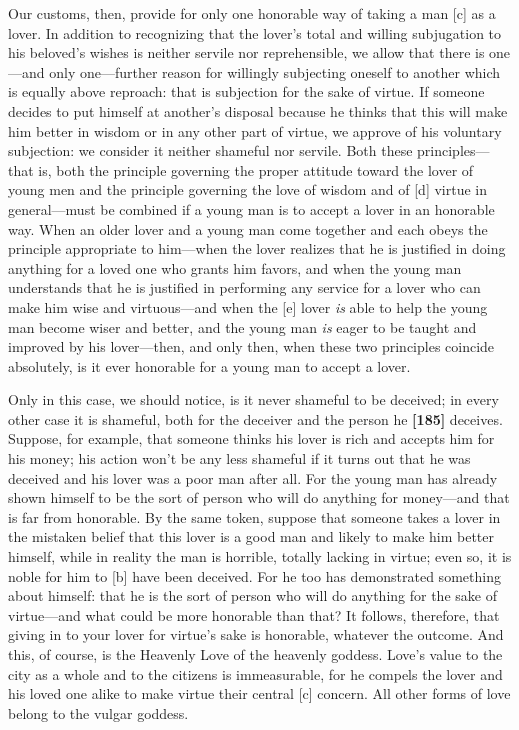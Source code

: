 Our customs, then, provide for only one honorable way of taking a man
{[}c{]} as a lover. In addition to recognizing that the lover's total
and willing subjugation to his beloved's wishes is neither servile nor
reprehensible, we allow that there is one---and only one---further
reason for willingly subjecting oneself to another which is equally
above reproach: that is subjection for the sake of virtue. If someone
decides to put himself at another's disposal because he thinks that this
will make him better in wisdom or in any other part of virtue, we
approve of his voluntary subjection: we consider it neither shameful nor
servile. Both these principles---that is, both the principle governing
the proper attitude toward the lover of young men and the principle
governing the love of wisdom and of {[}d{]} virtue in general---must be
combined if a young man is to accept a lover in an honorable way. When
an older lover and a young man come together and each obeys the
principle appropriate to him---when the lover realizes that he is
justified in doing anything for a loved one who grants him favors, and
when the young man understands that he is justified in performing any
service for a lover who can make him wise and virtuous---and when the
{[}e{]} lover {\em is} able to help the young man become wiser and
better, and the young man {\em is} eager to be taught and improved by
his lover---then, and only then, when these two principles coincide
absolutely, is it ever honorable for a young man to accept a lover.

Only in this case, we should notice, is it never shameful to be
deceived; in every other case it is shameful, both for the deceiver and
the person he {\bf {[}185{]}} deceives. Suppose, for example, that
someone thinks his lover is rich and accepts him for his money; his
action won't be any less shameful if it turns out that he was deceived
and his lover was a poor man after all. For the young man has already
shown himself to be the sort of person who will do anything for
money---and that is far from honorable. By the same token, suppose that
someone takes a lover in the mistaken belief that this lover is a good
man and likely to make him better himself, while in reality the man is
horrible, totally lacking in virtue; even so, it is noble for him to
{[}b{]} have been deceived. For he too has demonstrated something about
himself: that he is the sort of person who will do anything for the sake
of virtue---and what could be more honorable than that? It follows,
therefore, that giving in to your lover for virtue's sake is honorable,
whatever the outcome. And this, of course, is the Heavenly Love of the
heavenly goddess. Love's value to the city as a whole and to the
citizens is immeasurable, for he compels the lover and his loved one
alike to make virtue their central {[}c{]} concern. All other forms of
love belong to the vulgar goddess.

